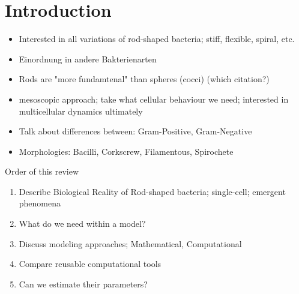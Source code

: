 \documentclass{article}
\begin{document}


\vfill
\pagebreak
\tableofcontents
\vfill
\pagebreak

\section{Introduction}

\begin{itemize}
    \item Interested in all variations of rod-shaped bacteria; stiff, flexible, spiral, etc.
    \item Einordnung in andere Bakterienarten
    \item Rods are "more fundamtenal" than spheres (cocci) (which citation?)
    \item mesoscopic approach; take what cellular behaviour we need; interested in multicellular
        dynamics ultimately
    \item Talk about differences between: Gram-Positive, Gram-Negative
    \item Morphologies: Bacilli, Corkscrew, Filamentous, Spirochete
\end{itemize}

Order of this review
\begin{enumerate}
    \item Describe Biological Reality of Rod-shaped bacteria; single-cell; emergent phenomena
    \item What do we need within a model?
    \item Discuss modeling approaches; Mathematical, Computational
    \item Compare reusable computational tools
    \item Can we estimate their parameters?
\end{enumerate}
\end{document}
